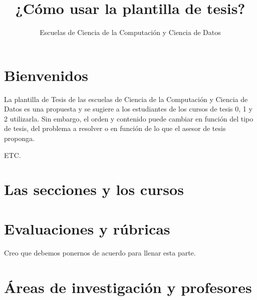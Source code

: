 \documentclass[12pt]{extarticle}
\author{\Large Escuelas de Ciencia de la Computación y Ciencia de Datos}
\title{\Huge ¿Cómo usar la plantilla de tesis?}
\begin{document}
\maketitle

\newpage

\section{Bienvenidos}

La plantilla de Tesis de las escuelas de Ciencia de la Computación y Ciencia de Datos es una propuesta y se sugiere a los estudiantes de los cursos de tesis 0, 1 y 2 utilizarla. Sin embargo, el orden y contenido puede cambiar en función del tipo de tesis, del problema a resolver o en función de lo que el asesor de tesis proponga. 

ETC.


\newpage

\section{Las secciones y los cursos}




\newpage

\section{Evaluaciones y rúbricas}

Creo que debemos ponernos de acuerdo para llenar esta parte.

\newpage

\section{Áreas de investigación y profesores}
\end{document}
